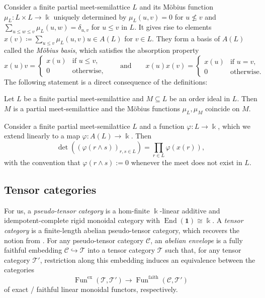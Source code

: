 \documentclass[11pt]{amsart}
\theoremstyle{definition}
\theoremstyle{remark}
\newcommand\cC{\mathcal C}
\newcommand\cT{\mathcal T}
\newcommand\kk{\Bbbk}
\renewcommand\:\colon
\newcommand\one{\mathbf{1}}
\newcommand\Fun{\operatorname{Fun}}
\renewcommand\:\colon
\newcommand\vfi{\varphi}
\newcommand\End{\operatorname{End}}
\begin{document}
Consider a finite partial meet-semilattice $L$ and its Möbius function $\mu_L: L \times L \to \kk$ uniquely determined by $\mu_L(u,v)=0$ for $u\not\leq v$ and $\sum_{u \leq w \leq v} \mu_L(u, w) = \delta_{u,v}$ for $u\leq v$ in $L$. It gives rise to elements $x(v) \coloneqq \sum_{u \leq v} \mu_L(u, v) u \in A(L)$ for $v \in L$. They form a basis of $A(L)$ called the \emph{Möbius basis}, which satisfies the absorption property
\begin{equation} \label{e:moebius-basis-properties}
    x(u) v = \begin{cases}
        x(u) & \text{if } u \leq v, \\
        0 & \text{otherwise},
    \end{cases} \qquad\text{and}\qquad
    x(u) x(v) = \begin{cases}
        x(u) & \text{if } u = v, \\
        0 & \text{otherwise}.
    \end{cases}
\end{equation}
The following statement is a direct consequence of the definitions:

\begin{lemma} \label{l:moebius-function-restricts}
    Let $L$ be a finite partial meet-semilattice and $M \subseteq L$ be an order ideal in $L$. Then $M$ is a partial meet-semilattice and the Möbius functions $\mu_L, \mu_M$ coincide on $M$.
\end{lemma}

\begin{lemma} \label{l:lindstroems-lemma}
    Consider a finite partial meet-semilattice $L$ and a function $\vfi: L \to \kk$, which we extend linearly to a map $\vfi: A(L) \to \kk$. Then
    \[
        \det((\vfi(r\wedge s))_{r, s \in L}) = \prod_{r \in L} \vfi(x(r)),
    \] 
    with the convention that $\vfi(r\wedge s):=0$ whenever the meet does not exist in $L$. 
\end{lemma}

\subsection{Tensor categories} \label{bg:tensorcat} For us, a \emph{pseudo-tensor category} is a hom-finite $\kk$-linear additive and idempotent-complete rigid monoidal category with $\End(\one)\cong\kk$. A \emph{tensor category} is a finite-length abelian pseudo-tensor category, which recovers the notion from \cite{EGNO}. For any pseudo-tensor category $\cC$, an \emph{abelian envelope} is a fully faithful embedding $\cC\hookrightarrow\cT$ into a tensor category $\cT$ such that, for any tensor category $\cT'$, restriction along this embedding induces an equivalence between the categories
$$
\Fun^{\text{ex}}(\cT,\cT') \to \Fun^{\text{faith}}(\cC,\cT')
$$
of exact / faithful linear monoidal functors, respectively.
\end{document}
